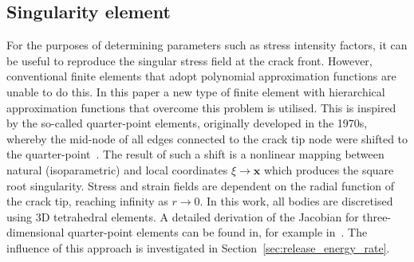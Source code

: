 \documentclass[onecolumn]{svjour3}
\begin{document}
\subsection{Singularity element}
\label{sec:singularity}
For the purposes of determining parameters such as stress intensity factors, it can be useful to reproduce the singular stress field at the crack front. However, conventional finite elements that adopt polynomial approximation functions are unable to do this. 
In this paper a new type of finite element with hierarchical approximation functions that overcome this problem is utilised. This is inspired by the so-called quarter-point elements, originally developed in the 1970s, whereby the mid-node of all edges connected to the crack tip node were shifted to the quarter-point~\cite{barsoum1976use,henshell1975crack}. 
% 
The result of such a shift is a nonlinear mapping between natural (isoparametric) and local coordinates $\xi \rightarrow \mathbf x$ which produces the square root singularity. Stress and strain fields are dependent on the radial function of the crack tip, reaching infinity as $ r \rightarrow 0$. 
% 
In this work, all bodies are discretised using 3D tetrahedral elements. A detailed derivation of the Jacobian for three-dimensional quarter-point elements can be found in, for example in~\citep{nejati2015use}. 
The influence of this approach is investigated in Section~\ref{sec:release_energy_rate}.

\end{document}
